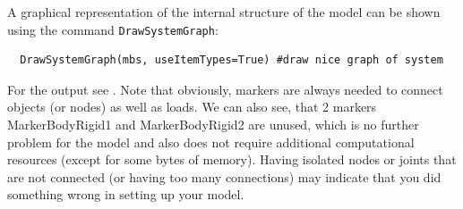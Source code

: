 \noindent A graphical representation of the internal structure of the model can be shown using the command \texttt{DrawSystemGraph}:
\pythonstyle\begin{lstlisting}
  DrawSystemGraph(mbs, useItemTypes=True) #draw nice graph of system
\end{lstlisting}
For the output see . Note that obviously, markers are always needed to connect objects (or nodes) as well as loads. We can also see, that 2 markers MarkerBodyRigid1 and MarkerBodyRigid2 are unused, which is no further problem for the model and also does not require additional computational resources (except for some bytes of memory). Having isolated nodes or joints that are not connected (or having too many connections) may indicate that you did something wrong in setting up your model.
%

